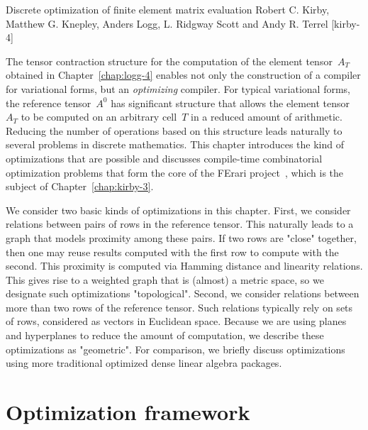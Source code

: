               {Discrete optimization of finite element matrix evaluation}
              {Robert C. Kirby, Matthew G. Knepley, Anders Logg, L. Ridgway Scott and Andy R. Terrel}
              {[kirby-4]}

\vspace{-0.5cm}

The tensor contraction structure for the computation of the element
tensor~$A_T$ obtained in Chapter~\ref{chap:logg-4} enables not only
the construction of a compiler for variational forms, but an
\emph{optimizing} compiler. For typical variational forms, the
reference tensor~$A^0$ has significant structure that allows the
element tensor~$A_T$ to be computed on an arbitrary cell~$T$ in a
reduced amount of arithmetic. Reducing the number of operations based
on this structure leads naturally to several problems in discrete
mathematics.  This chapter introduces the kind of optimizations that
are possible and discusses compile-time combinatorial optimization
problems that form the core of the FErari
project~\cite{KirbyLoggScottEtAl2006,KirbyScott2007,KirbyLogg2008},
which is the subject of Chapter~\ref{chap:kirby-3}.

We consider two basic kinds of optimizations in this chapter. First,
we consider relations between pairs of rows in the reference tensor.
This naturally leads to a graph that models proximity among these
pairs.  If two rows are "close" together, then one may reuse results
computed with the first row to compute with the second. This proximity
is computed via Hamming distance and linearity relations.  This gives
rise to a weighted graph that is (almost) a metric space, so we
designate such optimizations "topological". Second, we consider
relations between more than two rows of the reference tensor. Such
relations typically rely on sets of rows, considered as vectors in
Euclidean space. Because we are using planes and hyperplanes to reduce
the amount of computation, we describe these optimizations as
"geometric".  For comparison, we briefly discuss optimizations using
more traditional optimized dense linear algebra packages.

\section{Optimization framework}

